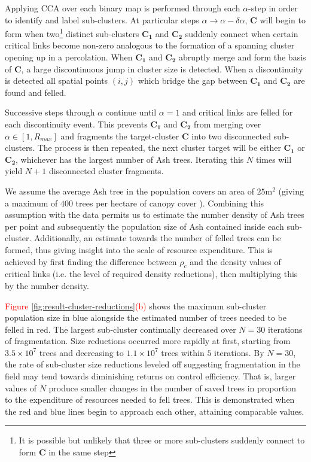 Applying CCA over each binary map is performed through each $\alpha$-step in order to identify and label sub-clusters. 
At particular steps $\alpha \rightarrow \alpha - \delta\alpha$, $\mathbf{C}$ will begin to form when two\footnote{
It is possible but unlikely that three or more sub-clusters suddenly connect to form $\mathbf{C}$ in the same step} 
distinct sub-clusters $\mathbf{C_1}$ and $\mathbf{C_2}$ suddenly connect when certain critical links become non-zero\textemdash
analogous to the formation of a spanning cluster opening up in a percolation. 
When $\mathbf{C_1}$ and $\mathbf{C_2}$ abruptly merge and form the basis of $\mathbf{C}$, a large discontinuous jump in cluster size is detected. 
When a discontinuity is detected all spatial points $(i,j)$ which bridge the gap between $\mathbf{C_1}$ and $\mathbf{C_2}$ are found and felled.

Successive steps through $\alpha$ continue until $\alpha=1$ and critical links are felled for each discontinuity event. 
This prevents $\mathbf{C_1}$ and $\mathbf{C_2}$ from merging over $\alpha \in [1, R_{max}]$ and fragments the target-cluster $\mathbf{C}$ into two disconnected sub-clusters. 
The process is then repeated, the next cluster target will be either $\mathbf{C_1}$ or $\mathbf{C_2}$, whichever has the largest number of Ash trees. 
Iterating this $N$ times will yield $N+1$ disconnected cluster fragments.

We assume the average Ash tree in the population covers an area of $\mathrm{25m^2}$ (giving a maximum of $400$ trees per hectare of canopy cover \cite{ash-tree2, ash-tree1}). 
Combining this assumption with the data permits us to estimate the number density of Ash trees per point and subsequently the population size of Ash contained inside each sub-cluster. 
Additionally, an estimate towards the number of felled trees can be formed, thus giving insight into the scale of resource expenditure. 
This is achieved by first finding the difference between $\rho_c$ and the density values of critical links (i.e. the level of required density reductions), then multiplying this by the number density.

\textcolor{red}{Figure \ref{fig:result-cluster-reductions}(b)} shows the maximum sub-cluster population size in blue alongside the estimated number of trees needed to be felled in red. 
The largest sub-cluster continually decreased over $N=30$ iterations of fragmentation. Size reductions occurred more rapidly at first, starting from $\mathrm{3.5\times 10^7}$ trees and decreasing to $\mathrm{1.1\times 10^7}$ trees within $5$ iterations. 
By $N=30$, the rate of sub-cluster size reductions leveled off suggesting fragmentation in the field may tend towards diminishing returns on control efficiency. 
That is, larger values of $N$ produce smaller changes in the number of saved trees in proportion to the expenditure of resources needed to fell trees. 
This is demonstrated when the red and blue lines begin to approach each other, attaining comparable values.

